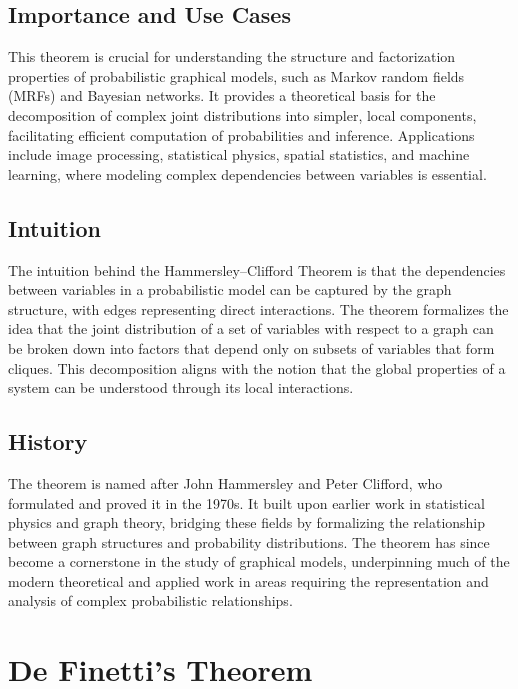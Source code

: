\documentclass{article}
\begin{document}
\subsection{Importance and Use Cases}
This theorem is crucial for understanding the structure and factorization properties of probabilistic graphical models, such as Markov random fields (MRFs) and Bayesian networks. It provides a theoretical basis for the decomposition of complex joint distributions into simpler, local components, facilitating efficient computation of probabilities and inference. Applications include image processing, statistical physics, spatial statistics, and machine learning, where modeling complex dependencies between variables is essential.

\subsection{Intuition}
The intuition behind the Hammersley–Clifford Theorem is that the dependencies between variables in a probabilistic model can be captured by the graph structure, with edges representing direct interactions. The theorem formalizes the idea that the joint distribution of a set of variables with respect to a graph can be broken down into factors that depend only on subsets of variables that form cliques. This decomposition aligns with the notion that the global properties of a system can be understood through its local interactions.

\subsection{History}
The theorem is named after John Hammersley and Peter Clifford, who formulated and proved it in the 1970s. It built upon earlier work in statistical physics and graph theory, bridging these fields by formalizing the relationship between graph structures and probability distributions. The theorem has since become a cornerstone in the study of graphical models, underpinning much of the modern theoretical and applied work in areas requiring the representation and analysis of complex probabilistic relationships.

\section{De Finetti's Theorem}
\end{document}
